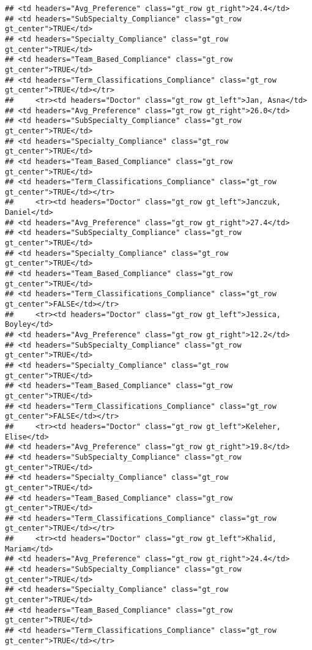 \documentclass[
]{article}
\begin{document}
\begin{verbatim}
## <td headers="Avg_Preference" class="gt_row gt_right">24.4</td>
## <td headers="SubSpecialty_Compliance" class="gt_row gt_center">TRUE</td>
## <td headers="Specialty_Compliance" class="gt_row gt_center">TRUE</td>
## <td headers="Team_Based_Compliance" class="gt_row gt_center">TRUE</td>
## <td headers="Term_Classifications_Compliance" class="gt_row gt_center">TRUE</td></tr>
##     <tr><td headers="Doctor" class="gt_row gt_left">Jan, Asna</td>
## <td headers="Avg_Preference" class="gt_row gt_right">26.0</td>
## <td headers="SubSpecialty_Compliance" class="gt_row gt_center">TRUE</td>
## <td headers="Specialty_Compliance" class="gt_row gt_center">TRUE</td>
## <td headers="Team_Based_Compliance" class="gt_row gt_center">TRUE</td>
## <td headers="Term_Classifications_Compliance" class="gt_row gt_center">TRUE</td></tr>
##     <tr><td headers="Doctor" class="gt_row gt_left">Janczuk, Daniel</td>
## <td headers="Avg_Preference" class="gt_row gt_right">27.4</td>
## <td headers="SubSpecialty_Compliance" class="gt_row gt_center">TRUE</td>
## <td headers="Specialty_Compliance" class="gt_row gt_center">TRUE</td>
## <td headers="Team_Based_Compliance" class="gt_row gt_center">TRUE</td>
## <td headers="Term_Classifications_Compliance" class="gt_row gt_center">FALSE</td></tr>
##     <tr><td headers="Doctor" class="gt_row gt_left">Jessica, Boyley</td>
## <td headers="Avg_Preference" class="gt_row gt_right">12.2</td>
## <td headers="SubSpecialty_Compliance" class="gt_row gt_center">TRUE</td>
## <td headers="Specialty_Compliance" class="gt_row gt_center">TRUE</td>
## <td headers="Team_Based_Compliance" class="gt_row gt_center">TRUE</td>
## <td headers="Term_Classifications_Compliance" class="gt_row gt_center">FALSE</td></tr>
##     <tr><td headers="Doctor" class="gt_row gt_left">Keleher, Elise</td>
## <td headers="Avg_Preference" class="gt_row gt_right">19.8</td>
## <td headers="SubSpecialty_Compliance" class="gt_row gt_center">TRUE</td>
## <td headers="Specialty_Compliance" class="gt_row gt_center">TRUE</td>
## <td headers="Team_Based_Compliance" class="gt_row gt_center">TRUE</td>
## <td headers="Term_Classifications_Compliance" class="gt_row gt_center">TRUE</td></tr>
##     <tr><td headers="Doctor" class="gt_row gt_left">Khalid, Mariam</td>
## <td headers="Avg_Preference" class="gt_row gt_right">24.4</td>
## <td headers="SubSpecialty_Compliance" class="gt_row gt_center">TRUE</td>
## <td headers="Specialty_Compliance" class="gt_row gt_center">TRUE</td>
## <td headers="Team_Based_Compliance" class="gt_row gt_center">TRUE</td>
## <td headers="Term_Classifications_Compliance" class="gt_row gt_center">TRUE</td></tr>

\end{verbatim}
\end{document}

